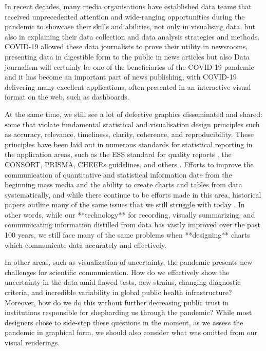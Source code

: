 \documentclass[article]{jdssv}\usepackage[]{graphicx}\usepackage[]{xcolor}
\begin{document}
In recent decades, many media organisations have established data teams that received unprecedented attention and wide-ranging opportunities during the pandemic to showcase their skills and abilities, not only in visualising data, but also in explaining their data collection and data analysis strategies and methods. COVID-19 allowed these data journalists to prove their utility in newsrooms, presenting data in digestible form to the public in news articles but also Data journalism will certainly be one of the beneficiaries of the COVID-19 pandemic and it has become an important part of news publishing, with COVID-19 delivering many excellent applications, often presented in an interactive visual format on the web, such as dashboards\citep{kochWelcomeRevolutionCOVID192021}.


At the same time, we still see a lot of defective graphics disseminated and shared: some that violate fundamental statistical and visualisation design principles such as accuracy, relevance, timeliness, clarity, coherence, and reproducibility. 
These principles have been laid out in numerous standards for statistical reporting in the application areas, such as the ESS standard for quality reports \citep{ess2009}, the CONSORT, PRISMA, CHEERs guidelines, and others \citep{EQUATORNetworkEnhancing}. 
Efforts to improve the communication of quantitative and statistical information date from the beginning mass media and the ability to create charts and tables from data systematically, and while there continue to be efforts made in this area, historical papers outline many of the same issues that we still struggle with today \citep{ASA-standards,haemerPresentationProblemsArea1949,kovermanPLANNINGVISUALPRESENTATION1961,fienbergGraphicalMethodsStatistics1979,Hoffrage2261,Tufte2001,Rosling2011,otavamylona2020}.
In other words, while our **technology** for recording, visually summarizing, and communicating information distilled from data has vastly improved over the past 100 years, we still face many of the same problems when **designing** charts which communicate data accurately and effectively.

In other areas, such as visualization of uncertainty, the pandemic presents new challenges for scientific communication. How do we effectively show the uncertainty in the data amid flawed tests, new strains, changing diagnostic criteria, and incredible variability in global public health infrastructure? Moreover, how do we do this without further decreasing public trust in institutions responsible for shepharding us through the pandemic? While most designers chose to side-step these questions in the moment, as we assess the pandemic in graphical form, we should also consider what was omitted from our visual renderings.
\end{document}
